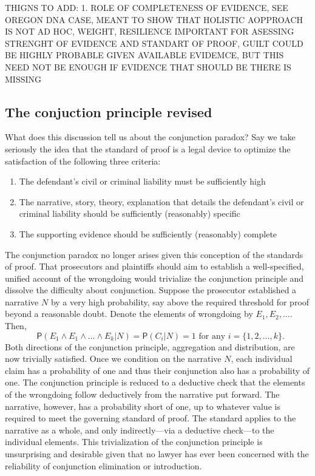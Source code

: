 \documentclass[
  10pt,
  dvipsnames,enabledeprecatedfontcommands]{scrartcl}
\newcommand{\mar}[1]{\todo[color=blue!40]{#1}}
\newcommand{\pr}[1]{\ensuremath{\mathsf{P}(#1)}}
\begin{document}
\mar{R: do you still want to add these?}

THIGNS TO ADD: 1. ROLE OF COMPLETENESS OF EVIDENCE, SEE OREGON DNA CASE,
MEANT TO SHOW THAT HOLISTIC AOPPROACH IS NOT AD HOC, WEIGHT, RESILIENCE
IMPORTANT FOR ASESSING STRENGHT OF EVIDENCE AND STANDART OF PROOF, GUILT
COULD BE HIGHLY PROBABLE GIVEN AVAILABLE EVIDEMCE, BUT THIS NEED NOT BE
ENOUGH IF EVIDENCE THAT SHOULD BE THERE IS MISSING

\hypertarget{the-conjuction-principle-revised}{%
\subsection{The conjuction principle
revised}\label{the-conjuction-principle-revised}}

What does this discussion tell us about the conjunction paradox? Say we
take seriously the idea that the standard of proof is a legal device to
optimize the satisfaction of the following three criteria:

\begin{enumerate}
\def\labelenumi{\arabic{enumi}.}
\item
  The defendant's civil or criminal liability must be sufficiently high
\item
  The narrative, story, theory, explanation that details the defendant's
  civil or criminal liability should be sufficiently (reasonably)
  specific
\item
  The supporting evidence should be sufficiently (reasonably) complete
\end{enumerate}

The conjunction paradox no longer arises given this conception of the
standards of proof. That prosecutors and plaintiffs should aim to
establish a well-specified, unified account of the wrongdoing would
trivialize the conjunction principle and dissolve the difficulty about
conjunction. Suppose the prosecutor established a narrative \(N\) by a
very high probability, say above the required threshold for proof beyond
a reasonable doubt. Denote the elements of wrongdoing by
\(E_1, E_2, \dots\). Then,
\[\text{ $\pr{E_1\wedge E_1 \wedge \dots \wedge E_k \vert N}=\pr{C_i \vert N} = 1$ for any $i=\{1, 2, ..., k\}$}.\]
\noindent Both directions of the conjunction principle, aggregation and
distribution, are now trivially satisfied. Once we condition on the
narrative \(N\), each individual claim has a probability of one and thus
their conjunction also has a probability of one. The conjunction
principle is reduced to a deductive check that the elements of the
wrongdoing follow deductively from the narrative put forward. The
narrative, however, has a probability short of one, up to whatever value
is required to meet the governing standard of proof. The standard
applies to the narrative as a whole, and only indirectly---via a
deductive check---to the individual elements. This trivialization of the
conjunction principle is unsurprising and desirable given that no lawyer
has ever been concerned with the reliability of conjunction elimination
or introduction.
\end{document}
